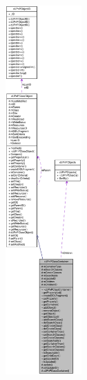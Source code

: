 \begin{figure}[H]
\begin{center}
\leavevmode
\includegraphics[height=400pt]{classcUPnPClassContainer__coll__graph}
\end{center}
\end{figure}
